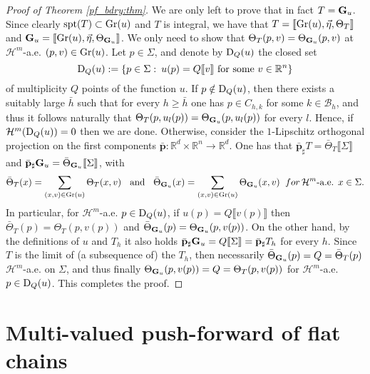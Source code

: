 \documentclass[a4paper,11pt,reqno]{amsart}
\theoremstyle{definition}
\numberwithin{equation}{section}
\numberwithin{subsection}{section}
\newcommand{\R}{\mathbb{R}}
\newcommand{\spt}{\mathrm{spt}}
\newcommand{\Ha}{\mathcal{H}}
\newcommand{\p}{\mathbf{p}}
\begin{document}
\begin{proof}[Proof of Theorem \ref{pf_bdry:thm}]
We are only left to prove that in fact $T = {\bf G}_{u}$. Since clearly $\spt(T) \subset {\rm Gr}(u)$ and $T$ is integral, we have that $T = \llbracket {\rm Gr}(u), \vec{\eta}, \Theta_{T} \rrbracket$ and ${\bf G}_{u} = \llbracket {\rm Gr}(u), \vec{\eta}, \Theta_{{\bf G}_{u}} \rrbracket$. We only need to show that $\Theta_{T}(p,v) = \Theta_{{\bf G}_{u}}(p,v)$ at $\Ha^{m}$-a.e. $(p,v) \in {\rm Gr}(u)$. Let $p \in \Sigma$, and denote by ${\rm D}_{Q}(u)$ the closed set
\[
{\rm D}_{Q}(u) := \lbrace p \in \Sigma \, \colon \, u(p) = Q \llbracket v \rrbracket \mbox{ for some } v \in \R^{n} \rbrace 
\]
of multiplicity $Q$ points of the function $u$. If $p \notin {\rm D}_{Q}(u)$, then there exists a suitably large $\bar{h}$ such that for every $h \geq \bar{h}$ one has $p \in C_{h,k}$ for some $k \in \mathscr{B}_{h}$, and thus it follows naturally that $\Theta_{T}(p, u_{l}(p)) = \Theta_{{\bf G}_{u}}(p, u_{l}(p))$ for every $l$. Hence, if $\Ha^{m}({\rm D}_{Q}(u)) = 0$ then we are done. Otherwise, consider the $1$-Lipschitz orthogonal projection on the first components $\bar{\p} \colon \R^{d} \times \R^{n} \to \R^{d}$. One has that $\bar{\p}_{\sharp}T = \bar{\Theta}_{T} \llbracket \Sigma \rrbracket$ and $\bar{\p}_{\sharp}{\bf G}_{u} = \bar{\Theta}_{{\bf G}_{u}} \llbracket \Sigma \rrbracket$, with
\[
\bar{\Theta}_{T}(x) = \sum_{(x,v) \in {\rm Gr}(u)} \Theta_{T}(x,v) \hspace{0.2cm} \mbox{ and } \hspace{0.2cm} \bar{\Theta}_{{\bf G}_{u}}(x) = \sum_{(x,v) \in {\rm Gr}(u)} \Theta_{{\bf G}_{u}}(x,v) \hspace{0.2cm} { for } \, \Ha^{m}\mbox{-a.e. } x \in \Sigma.
\]
In particular, for $\Ha^{m}$-a.e. $p \in {\rm D}_{Q}(u)$, if $u(p) = Q \llbracket v(p) \rrbracket$ then $\bar{\Theta}_{T}(p) = \Theta_{T}(p, v(p))$ and $\bar{\Theta}_{{\bf G}_{u}}(p) = \Theta_{{\bf G}_{u}}(p,v(p))$. On the other hand, by the definitions of $u$ and $T_{h}$ it also holds $\bar{\p}_{\sharp} {\bf G}_{u} = Q \llbracket \Sigma \rrbracket = \bar{\p}_{\sharp} T_{h}$ for every $h$. Since $T$ is the limit of (a subsequence of) the $T_{h}$, then necessarily $\bar{\Theta}_{{\bf G}_{u}}(p) = Q = \bar{\Theta}_{T}(p)$ $\Ha^{m}$-a.e. on $\Sigma$, and thus finally $\Theta_{{\bf G}_{u}}(p, v(p)) = Q = \Theta_{T}(p, v(p))$ for $\Ha^{m}$-a.e. $p \in {\rm D}_{Q}(u)$. This completes the proof.
\end{proof}



\section{Multi-valued push-forward of flat chains}\label{ssec:pf_fc} 
\end{document}
